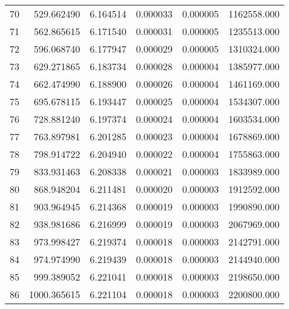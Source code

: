 \begin{tabular}{lrrrrr}
70 &   529.662490 &  6.164514 &  0.000033 &  0.000005 &  1162558.000 \\
71 &   562.865615 &  6.171540 &  0.000031 &  0.000005 &  1235513.000 \\
72 &   596.068740 &  6.177947 &  0.000029 &  0.000005 &  1310324.000 \\
73 &   629.271865 &  6.183734 &  0.000028 &  0.000004 &  1385977.000 \\
74 &   662.474990 &  6.188900 &  0.000026 &  0.000004 &  1461169.000 \\
75 &   695.678115 &  6.193447 &  0.000025 &  0.000004 &  1534307.000 \\
76 &   728.881240 &  6.197374 &  0.000024 &  0.000004 &  1603534.000 \\
77 &   763.897981 &  6.201285 &  0.000023 &  0.000004 &  1678869.000 \\
78 &   798.914722 &  6.204940 &  0.000022 &  0.000004 &  1755863.000 \\
79 &   833.931463 &  6.208338 &  0.000021 &  0.000003 &  1833989.000 \\
80 &   868.948204 &  6.211481 &  0.000020 &  0.000003 &  1912592.000 \\
81 &   903.964945 &  6.214368 &  0.000019 &  0.000003 &  1990890.000 \\
82 &   938.981686 &  6.216999 &  0.000019 &  0.000003 &  2067969.000 \\
83 &   973.998427 &  6.219374 &  0.000018 &  0.000003 &  2142791.000 \\
84 &   974.974990 &  6.219439 &  0.000018 &  0.000003 &  2144940.000 \\
85 &   999.389052 &  6.221041 &  0.000018 &  0.000003 &  2198650.000 \\
86 &  1000.365615 &  6.221104 &  0.000018 &  0.000003 &  2200800.000 \\
\bottomrule
\end{tabular}
